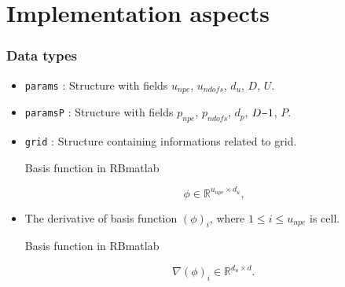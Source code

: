 \documentclass{beamer}
\newcommand{\minus}{\scalebox{0.75}[1.0]{$-$}}
\begin{document}
\section{Implementation aspects}


\begin{frame}
\frametitle{Data types}

\begin{itemize}
\item \texttt{params} : Structure with fields $u_{npe}$, $u_{ndofs}$, $d_u$, $D$, $U$.

\item \texttt{paramsP} : Structure with fields $p_{npe}$, $p_{ndofs}$, $d_p$, $D \minus 1$, $P$.

\item \texttt{grid} : Structure containing informations related to grid.

\begin{block}{Basis function in RBmatlab}

\begin{equation}\label{basis_func_velocity_rbmatlab}
\phi \in \mathbb{R}^{u_{npe} \times d_u} \textrm{,}
\end{equation}

\end{block}

\item The derivative of basis function $(\phi)_{i}$, where $1 \leq i \leq u_{npe}$ is cell.

\begin{block}{Basis function in RBmatlab}

\begin{equation}\label{basis_func_derivative_velocity_rbmatlab}
\nabla (\phi)_{i} \in \mathbb{R}^{{d_u} \times d} \textrm{.}
\end{equation}

\end{block}

\end{itemize}

\end{frame}

\end{document}

